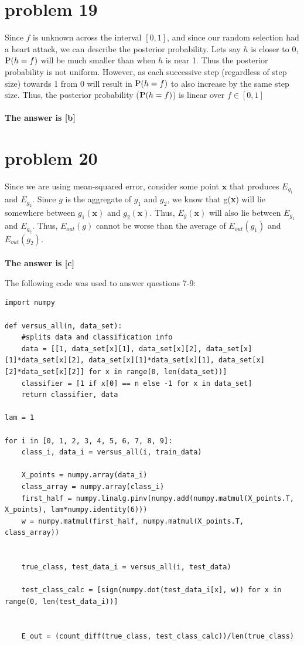 \documentclass{article}
\newcommand{\probP}{\text{I\kern-0.35em P}}
\begin{document}
\section*{problem 19}
Since $f$ is unknown across the interval $[0, 1]$, and since our random selection had a heart attack, we can describe the posterior probability. Lets say $h$ is closer to 0, $\probP(h=f)$ will be much smaller than when $h$ is near 1. Thus the posterior probability is not uniform. However, as each successive step (regardless of step size) towards 1 from 0 will result in $\probP(h=f)$ to also increase by the same step size. Thus, the posterior probability ($\probP(h=f)$) is linear over $f\in[0, 1]$\\\\
\textbf{The answer is [b]}

\section*{problem 20}
Since we are using mean-squared error, consider some point $\textbf{x}$ that produces $E_{g_1}$ and $E_{g_2}$. Since $g$ is the aggregate of $g_1$ and $g_2$, we know that g(\textbf{x}) will lie somewhere between $g_1(\textbf{x})$ and $g_2(\textbf{x})$. Thus, $E_{g}(\textbf{x})$ will also lie between $E_{g_1}$ and $E_{g_2}$. Thus, $E_{out}(g)$ cannot be worse than the average of $E_{out}(g_1)$ and $E_{out}(g_2)$.\\\\
\textbf{The answer is [c]}


\newpage
{\huge The following code was used to answer questions 7-9:}
\begin{verbatim}
import numpy

def versus_all(n, data_set):
    #splits data and classification info
    data = [[1, data_set[x][1], data_set[x][2], data_set[x][1]*data_set[x][2], data_set[x][1]*data_set[x][1], data_set[x][2]*data_set[x][2]] for x in range(0, len(data_set))]
    classifier = [1 if x[0] == n else -1 for x in data_set]
    return classifier, data

lam = 1

for i in [0, 1, 2, 3, 4, 5, 6, 7, 8, 9]:
    class_i, data_i = versus_all(i, train_data)
    
    X_points = numpy.array(data_i)
    class_array = numpy.array(class_i)
    first_half = numpy.linalg.pinv(numpy.add(numpy.matmul(X_points.T, X_points), lam*numpy.identity(6)))
    w = numpy.matmul(first_half, numpy.matmul(X_points.T, class_array))
    
   
    true_class, test_data_i = versus_all(i, test_data)
    
    test_class_calc = [sign(numpy.dot(test_data_i[x], w)) for x in range(0, len(test_data_i))]
    
    
    E_out = (count_diff(true_class, test_class_calc))/len(true_class)
\end{verbatim}
\end{document}
